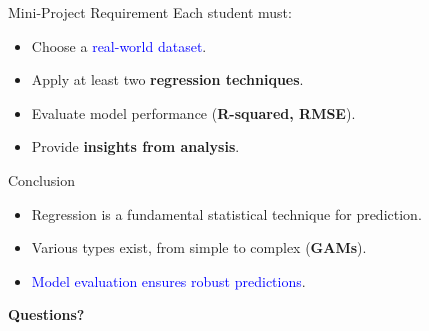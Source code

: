 \documentclass{beamer}
\begin{document}
\begin{frame}{Mini-Project Requirement}
    Each student must:
    \begin{itemize}
        \item Choose a \textcolor{blue}{real-world dataset}.
        \item Apply at least two \textbf{regression techniques}.
        \item Evaluate model performance (\textbf{R-squared, RMSE}).
        \item Provide \textbf{insights from analysis}.
    \end{itemize}
\end{frame}

\begin{frame}{Conclusion}
    \begin{itemize}
        \item Regression is a fundamental statistical technique for prediction.
        \item Various types exist, from simple to complex (\textbf{GAMs}).
        \item \textcolor{blue}{Model evaluation ensures robust predictions}.
    \end{itemize}
    
    \textbf{Questions?}
\end{frame}
\end{document}
